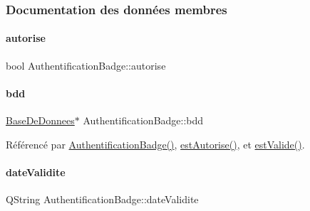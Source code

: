 \subsubsection{Documentation des données membres}
\mbox{\label{class_authentification_badge_a79ea3c5d0df4f8f04863d3e218d8a6f0}} 
\paragraph{\texorpdfstring{autorise}{autorise}}
{\footnotesize\ttfamily bool Authentification\+Badge\+::autorise\hspace{0.3cm}{\ttfamily [private]}}

\mbox{\label{class_authentification_badge_a0b9c724c5bc25bf1f87443d7e6833398}} 
\paragraph{\texorpdfstring{bdd}{bdd}}
{\footnotesize\ttfamily \hyperlink{class_base_de_donnees}{Base\+De\+Donnees}$\ast$ Authentification\+Badge\+::bdd\hspace{0.3cm}{\ttfamily [private]}}



Référencé par \hyperlink{class_authentification_badge_a6c27fe0dc2a4a20fec1e75da5b400146}{Authentification\+Badge()}, \hyperlink{class_authentification_badge_aceb9c5a09dddbff73cd02973913c79c1}{est\+Autorise()}, et \hyperlink{class_authentification_badge_af320bf9cdbb285c48cd323e0ec3ef529}{est\+Valide()}.

\mbox{\label{class_authentification_badge_a3ff41c56490c3cfd0322949be2338605}} 
\paragraph{\texorpdfstring{date\+Validite}{dateValidite}}
{\footnotesize\ttfamily Q\+String Authentification\+Badge\+::date\+Validite\hspace{0.3cm}{\ttfamily [private]}}



